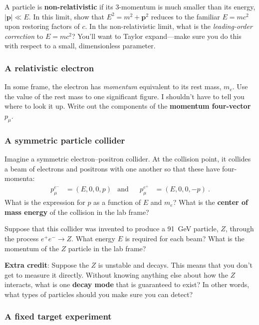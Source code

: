 \documentclass[12pt]{article}
\numberwithin{equation}{section}    %
\renewcommand{\vec}[1]{\mathbf{#1}} %
\begin{document}
A particle is \textbf{non-relativistic} if its 3-momentum is much smaller than its energy, $|\vec{p}| \ll E$. In this limit, show that $E^2 = m^2 + \vec{p}^2$ reduces to the familiar $E=mc^2$ upon restoring factors of $c$. In ths non-relativistic limit, what is the \emph{leading-order correction} to $E=mc^2$? You'll want to Taylor expand---make sure you do this with respect to a small, dimensionless parameter.

\subsubsection{A relativistic electron}

In some frame, the electron has \emph{momentum} equivalent to its rest mass, $m_e$. Use the value of the rest mass to one significant figure. I shouldn't have to tell you where to look it up. Write out the components of the \textbf{momentum four-vector} $p_\mu$. 

\subsubsection{A symmetric particle collider}

Imagine a symmetric electron--positron collider. At the collision point, it collides a beam of electrons and positrons with one another so that these have four-momenta:
\begin{align}
	p_\mu^{e^-} &= (E,0,0,p)
	&
	\text{and}
	&&
	p_\mu^{e^+} &= (E,0,0,-p) \ .
\end{align}
What is the expression for $p$ as a function of $E$ and $m_e$? What is the \textbf{center of mass energy} of the collision in the lab frame?

Suppose that this collider was invented to produce a 91~GeV particle, $Z$, through the process $e^+ e^- \to Z$. What energy $E$ is required for each beam? What is the momentum of the $Z$ particle in the lab frame?

\textbf{Extra credit}: Suppose the $Z$ is unstable and decays. This means that you don't get to measure it directly. Without knowing anything else about how the $Z$ interacts, what is one \textbf{decay mode} that is guaranteed to exist? In other words, what types of particles should you make sure you can detect? 

\subsubsection{A fixed target experiment}
\end{document}
